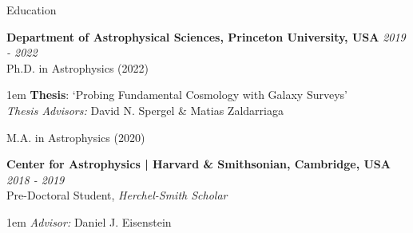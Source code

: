 \documentclass{resume} %
\begin{document}
\begin{rSection}{Education}

{\bf Department of Astrophysical Sciences, Princeton University, USA} \hfill {\em 2019 - 2022} \\
Ph.D. in Astrophysics (2022)
\begin{addmargin}[1em]{1em}
\textbf{Thesis}: `Probing Fundamental Cosmology with Galaxy Surveys'\smallskip\\
\textit{Thesis Advisors:} David N. Spergel \& Matias Zaldarriaga
\end{addmargin}
M.A. in Astrophysics (2020)

{\bf Center for Astrophysics | Harvard \& Smithsonian, Cambridge, USA} \hfill {\em 2018 - 2019} \\ 
Pre-Doctoral Student, \textit{Herchel-Smith Scholar}
\begin{addmargin}[1em]{1em}
\textit{Advisor:} Daniel J. Eisenstein
\end{addmargin}


\end{rSection}
\end{document}
